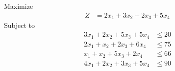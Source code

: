 \documentclass[12pt]{article}
\begin{document}
\subsection{}
Maximize
\begin{align*}
Z                           & = 2x_{1}+3x_{2}+2x_{3}+5x_{4}
\end{align*}
Subject to
\begin{align*}
3x_{1}+2x_{2}+5x_{3}+5x_{4} & \le 20                                                                                                                                                                            \\
2x_{1}+x_{2}+2x_{3}+6x_{4}  & \le 75                                                                                                                                                                            \\
x_{1}+x_{2}+5x_{3}+2x_{4}   & \le 66                                                                                                                                                                            \\
4x_{1}+2x_{2}+3x_{3}+5x_{4} & \le 90                                                                                                                                                                            \\
\end{align*}
\end{document}
